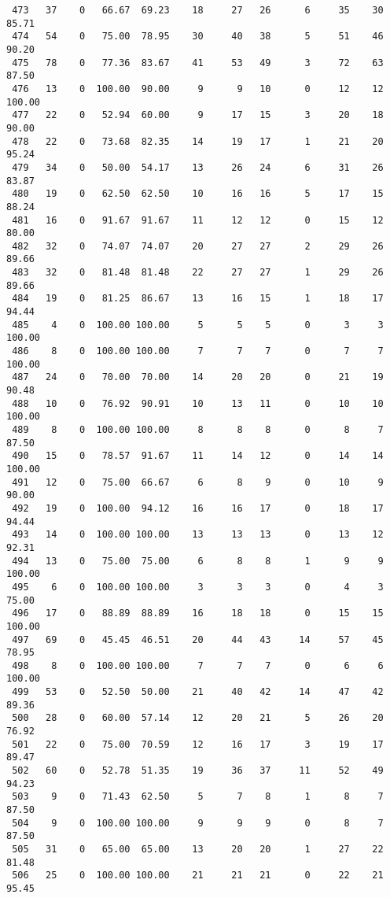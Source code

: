 \begin{verbatim}
 473   37    0   66.67  69.23    18     27   26      6     35    30    85.71
 474   54    0   75.00  78.95    30     40   38      5     51    46    90.20
 475   78    0   77.36  83.67    41     53   49      3     72    63    87.50
 476   13    0  100.00  90.00     9      9   10      0     12    12   100.00
 477   22    0   52.94  60.00     9     17   15      3     20    18    90.00
 478   22    0   73.68  82.35    14     19   17      1     21    20    95.24
 479   34    0   50.00  54.17    13     26   24      6     31    26    83.87
 480   19    0   62.50  62.50    10     16   16      5     17    15    88.24
 481   16    0   91.67  91.67    11     12   12      0     15    12    80.00
 482   32    0   74.07  74.07    20     27   27      2     29    26    89.66
 483   32    0   81.48  81.48    22     27   27      1     29    26    89.66
 484   19    0   81.25  86.67    13     16   15      1     18    17    94.44
 485    4    0  100.00 100.00     5      5    5      0      3     3   100.00
 486    8    0  100.00 100.00     7      7    7      0      7     7   100.00
 487   24    0   70.00  70.00    14     20   20      0     21    19    90.48
 488   10    0   76.92  90.91    10     13   11      0     10    10   100.00
 489    8    0  100.00 100.00     8      8    8      0      8     7    87.50
 490   15    0   78.57  91.67    11     14   12      0     14    14   100.00
 491   12    0   75.00  66.67     6      8    9      0     10     9    90.00
 492   19    0  100.00  94.12    16     16   17      0     18    17    94.44
 493   14    0  100.00 100.00    13     13   13      0     13    12    92.31
 494   13    0   75.00  75.00     6      8    8      1      9     9   100.00
 495    6    0  100.00 100.00     3      3    3      0      4     3    75.00
 496   17    0   88.89  88.89    16     18   18      0     15    15   100.00
 497   69    0   45.45  46.51    20     44   43     14     57    45    78.95
 498    8    0  100.00 100.00     7      7    7      0      6     6   100.00
 499   53    0   52.50  50.00    21     40   42     14     47    42    89.36
 500   28    0   60.00  57.14    12     20   21      5     26    20    76.92
 501   22    0   75.00  70.59    12     16   17      3     19    17    89.47
 502   60    0   52.78  51.35    19     36   37     11     52    49    94.23
 503    9    0   71.43  62.50     5      7    8      1      8     7    87.50
 504    9    0  100.00 100.00     9      9    9      0      8     7    87.50
 505   31    0   65.00  65.00    13     20   20      1     27    22    81.48
 506   25    0  100.00 100.00    21     21   21      0     22    21    95.45

\end{verbatim}
